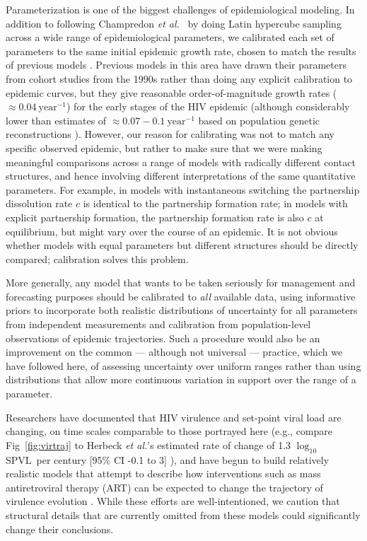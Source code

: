 \documentclass[10pt,letterpaper]{article}
\renewcommand{\figurename}{Fig}
\newcommand{\Lspvl}{$\log_{10}$ SPVL}
\newcommand{\etal}{\textit{et al.}}
\begin{document}
Parameterization is one of the biggest challenges of epidemiological
modeling. In addition to following Champredon \etal\ \cite{champredon_hiv_2013} 
by doing Latin hypercube
sampling across a wide range of epidemiological parameters, we 
calibrated each set of parameters to the same initial epidemic
growth rate, chosen to match the results of previous models
\cite{shirreff_transmission_2011}.  Previous models 
in this area have drawn their
parameters from cohort studies from the 1990s
\cite{wawer2005rates,hollingsworth_hiv1_2008}
rather than doing any explicit calibration to epidemic curves,
but they give reasonable order-of-magnitude
growth rates ($\approx 0.04~\textrm{year}^{-1}$)
for the early stages of the HIV epidemic (although considerably
lower than estimates of $\approx 0.07-0.1~\textrm{year}^{-1}$
based on population genetic reconstructions \cite{faria_early_2014}).
However, our reason for calibrating was not to match any
specific observed epidemic, but rather to make sure that
we were making meaningful comparisons across a range of
models with radically different contact structures, and
hence involving different interpretations of the same quantitative
parameters.  For example, in models with instantaneous switching the
partnership dissolution rate $c$ is identical to the partnership
formation rate; in models with explicit partnership formation,
the partnership formation rate is also $c$ at equilibrium,
but might vary over the course of an epidemic.
It is not obvious whether models with equal parameters but
different structures should be directly compared; calibration
solves this problem.

More generally, any model that wants to be
taken seriously for management and forecasting purposes should
be calibrated to \emph{all} available data, using informative
priors to incorporate both realistic distributions of uncertainty
for all parameters from independent measurements \cite{elderd_uncertainty_2006}
and calibration from population-level observations of epidemic
trajectories. Such a procedure would also be an improvement on the common --- although not universal --- %
practice, which we have followed here,
of assessing uncertainty over uniform ranges rather than
using distributions that allow more continuous variation in support over
the range of a parameter.

Researchers have documented that HIV virulence and set-point viral
load are changing, on time scales comparable to those portrayed here
(e.g., compare \figurename~\ref{fig:virtraj} to Herbeck \etal's
estimated rate of change of 1.3 \Lspvl\ per century [95\% CI -0.1 to
  3] \cite{herbeck_is_2012}), and have begun to build relatively realistic models that
attempt to describe how interventions such as mass antiretroviral
therapy (ART) can be expected to change the trajectory of virulence
evolution \cite{payne_impact_2014,roberts2015impact,herbeck_evolution_2016}.  While these
efforts are well-intentioned, we caution that 
structural details that are currently omitted from these models
could significantly change their conclusions.
\end{document}
